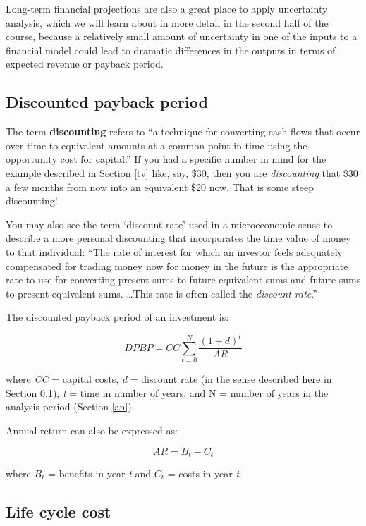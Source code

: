 \documentclass[10pt]{article}
\begin{document}
Long-term financial projections are also a great place to apply uncertainty analysis, which we will learn about in more detail in the second half of the course, because a relatively small amount of uncertainty in one of the inputs to a financial model could lead to dramatic differences in the outputs in terms of expected revenue or payback period.

\subsection{Discounted payback period}
\label{dp}

The term \textbf{discounting} refers to ``a technique for converting cash flows that occur over time to equivalent amounts at a common point in time using the opportunity cost for capital.'' \cite{Goswami2007-hf} If you had a specific number in mind for the example described in Section \ref{tv} like, say, \$30, then you are \textit{discounting} that \$30 a few months from now into an equivalent \$20 now. That is some steep discounting!

You may also see the term `discount rate' used in a microeconomic sense to describe a more personal discounting that incorporates the time value of money to that individual: ``The rate of interest for which an investor feels adequately compensated for trading money now for money in the future is the appropriate rate to use for converting present sums to future equivalent sums and future sums to present equivalent sums. \ldots This rate is often called the \textit{discount rate}.'' 

The discounted payback period of an investment is: 

$$
DPBP = CC \sum_{t=0}^{N} \frac{(1+d)^t}{AR}
$$

where \textit{CC} = capital costs, \textit{d} = discount rate (in the sense described here in Section \ref{dp}), \textit{t} = time in number of years, and N = number of years in the analysis period (Section \ref{an}).

Annual return can also be expressed as:

$$AR=B_t-C_t$$

where $B_t$ = benefits in year \textit{t} and $C_t$ = costs in year \textit{t}. \cite{Goswami2007-hf}

\subsection{Life cycle cost}
\end{document}
